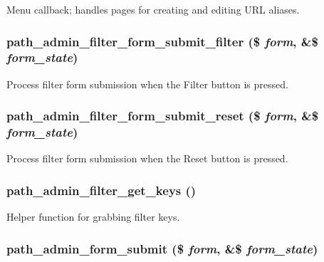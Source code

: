 Menu callback; handles pages for creating and editing URL aliases. \hypertarget{path_8admin_8inc_250d1de05853ce7562fb1b9530dba273}{
\subsubsection[{path\_\-admin\_\-filter\_\-form\_\-submit\_\-filter}]{\setlength{\rightskip}{0pt plus 5cm}path\_\-admin\_\-filter\_\-form\_\-submit\_\-filter (\$ {\em form}, \/  \&\$ {\em form\_\-state})}}
\label{path_8admin_8inc_250d1de05853ce7562fb1b9530dba273}


Process filter form submission when the Filter button is pressed. \hypertarget{path_8admin_8inc_89dc681fab5e84263049933d97823291}{
\subsubsection[{path\_\-admin\_\-filter\_\-form\_\-submit\_\-reset}]{\setlength{\rightskip}{0pt plus 5cm}path\_\-admin\_\-filter\_\-form\_\-submit\_\-reset (\$ {\em form}, \/  \&\$ {\em form\_\-state})}}
\label{path_8admin_8inc_89dc681fab5e84263049933d97823291}


Process filter form submission when the Reset button is pressed. \hypertarget{path_8admin_8inc_191749aff70cdc1cf300221d9f641206}{
\subsubsection[{path\_\-admin\_\-filter\_\-get\_\-keys}]{\setlength{\rightskip}{0pt plus 5cm}path\_\-admin\_\-filter\_\-get\_\-keys ()}}
\label{path_8admin_8inc_191749aff70cdc1cf300221d9f641206}


Helper function for grabbing filter keys. \hypertarget{path_8admin_8inc_9e4a6b6f202fad04dcdb2bbcd800d168}{
\subsubsection[{path\_\-admin\_\-form\_\-submit}]{\setlength{\rightskip}{0pt plus 5cm}path\_\-admin\_\-form\_\-submit (\$ {\em form}, \/  \&\$ {\em form\_\-state})}}
\label{path_8admin_8inc_9e4a6b6f202fad04dcdb2bbcd800d168}



